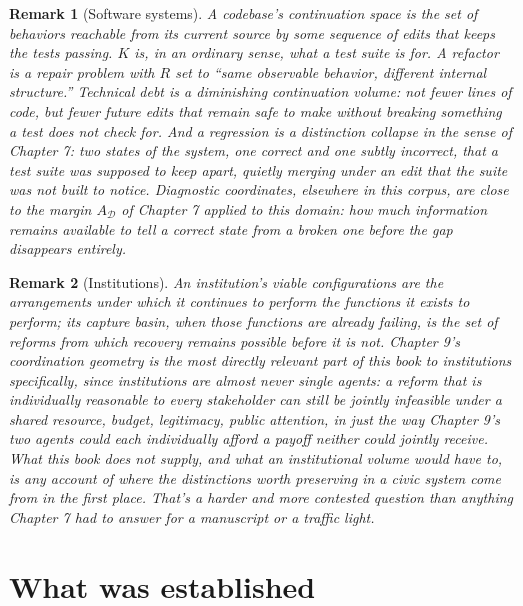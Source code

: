\documentclass[11pt]{report}
\newtheorem{remark}{Remark}[chapter]
\begin{document}
\begin{remark}[Software systems]
A codebase's continuation space is the set of behaviors reachable from
its current source by some sequence of edits that keeps the tests
passing. $K$ is, in an ordinary sense, what a test suite is
for. A refactor is a repair problem with $R$ set to ``same observable
behavior, different internal structure.'' Technical debt is a
diminishing continuation volume: not fewer lines of code, but fewer
future edits that remain safe to make without breaking something a
test does not check for. And a regression is a distinction
collapse in the sense of Chapter 7: two states of the system, one
correct and one subtly incorrect, that a test suite was supposed to keep apart,
quietly merging under an edit that the suite was not built to notice.
Diagnostic coordinates, elsewhere in this corpus, are close to
the margin $A_{\mathcal D}$ of Chapter 7 applied to this domain: how
much information remains available to tell a correct state from a
broken one before the gap disappears entirely.
\end{remark}

\begin{remark}[Institutions]
An institution's viable configurations are the arrangements under
which it continues to perform the functions it exists to perform;
its capture basin, when those functions are already failing, is the
set of reforms from which recovery remains possible before it is not.
Chapter 9's coordination geometry is the most directly relevant part
of this book to institutions specifically, since institutions are
almost never single agents: a reform that is individually reasonable
to every stakeholder can still be jointly infeasible under a shared
resource, budget, legitimacy, public attention, in just the way
Chapter 9's two agents could each individually afford a payoff neither
could jointly receive. What this book does not supply, and what an
institutional volume would have to, is any account of where the
distinctions worth preserving in a civic system come from in the first
place. That's a harder and more contested question than anything Chapter 7
had to answer for a manuscript or a traffic light.
\end{remark}

\section*{What was established}
\end{document}
